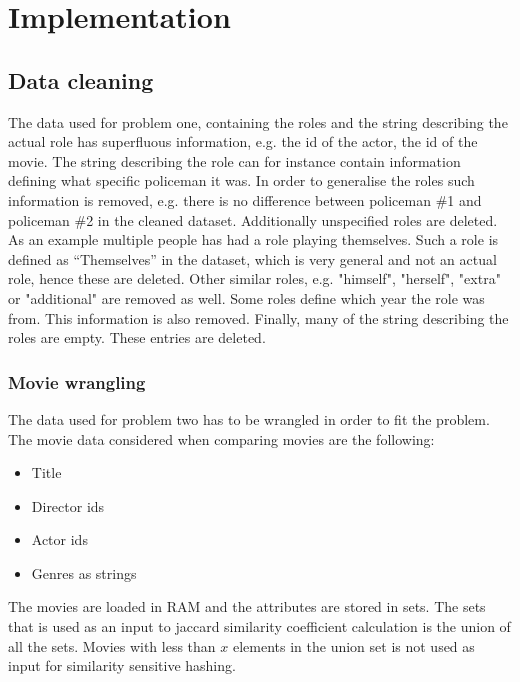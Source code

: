 \section{Implementation}

\subsection{Data cleaning}
The data used for problem one, containing the roles and the string describing the actual role has superfluous information, e.g. the id of the actor, the id of the movie. The string describing the role can for instance contain information defining what specific policeman it was. In order to generalise the roles such information is removed, e.g. there is no difference between policeman \#1 and policeman \#2 in the cleaned dataset. Additionally unspecified roles are deleted. As an example multiple people has had a role playing themselves. Such a role is defined as “Themselves” in the dataset, which is very general and not an actual role, hence these are deleted. Other similar roles, e.g. "himself", "herself", "extra" or "additional" are removed as well. Some roles define which year the role was from. This information is also removed. Finally, many of the string describing the roles are empty. These entries are deleted.

\subsubsection{Movie wrangling}
The data used for problem two has to be wrangled in order to fit the problem. The movie data considered when comparing movies are the following:
\begin{itemize}
\item Title
\item Director ids
\item Actor ids
\item Genres as strings
\end{itemize}
The movies are loaded in RAM and the attributes are stored in sets. The sets that is used as an input to jaccard similarity coefficient calculation is the union of all the sets. Movies with less than \(x\) elements in the union set is not used as input for similarity sensitive hashing.

